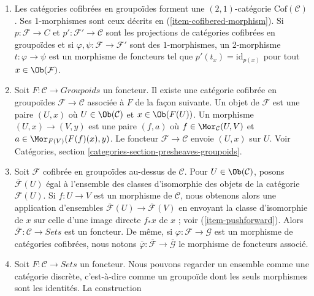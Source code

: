 \begin{remarks}
\begin{enumerate}
et $\mathcal{F}'$ sont des catégories cofibrées en groupoïdes au-dessus de
$\mathcal{C}$, nous notons les morphismes de $\mathcal{F}$ vers $\mathcal{F}'$
par $\Mor_\mathcal{C}(\mathcal{F}, \mathcal{F}')$.
\item
\label{item-definition-cofibered-groupoids-2-category}
Les catégories cofibrées en groupoïdes forment une $(2, 1)$-catégorie
$\text{Cof}(\mathcal{C})$. Ses 1-morphismes sont ceux décrits en
(\ref{item-cofibered-morphism}). Si $p : \mathcal{F} \to C$ et
$p': \mathcal{F}' \to \mathcal{C}$ sont les projections de catégories
cofibrées en groupoïdes et si $\varphi, \psi : \mathcal{F} \to \mathcal{F}'$
sont des $1$-morphismes, un 2-morphisme $t : \varphi \to \psi$ est un morphisme
de foncteurs tel que $p'(t_x) = \text{id}_{p(x)}$ pour tout $x \in \Ob(\mathcal{F})$.
\item
\label{item-construction-associated-cofibered-groupoid}
Soit $F : \mathcal{C} \to \textit{Groupoids}$ un foncteur. Il
existe une catégorie cofibrée en groupoïdes $\mathcal{F} \to \mathcal{C}$
associée à $F$ de la façon suivante. Un objet de $\mathcal{F}$ est une paire $(U, x)$
où $U \in \Ob(\mathcal{C})$ et $x \in \Ob(F(U))$. Un
morphisme $(U, x) \to (V, y)$ est une paire $(f, a)$ où
$f \in \Mor_\mathcal{C}(U, V)$ et
$a \in \Mor_{F(V)}(F(f)(x), y)$.
Le foncteur $\mathcal{F} \to \mathcal{C}$ envoie $(U, x)$ sur $U$. Voir
Catégories, section \ref{categories-section-presheaves-groupoids}.
\item
\label{item-associated-functor-isomorphism-classes}
Soit $\mathcal{F}$ cofibrée en groupoïdes au-dessus de $\mathcal{C}$.
Pour $U \in \Ob(\mathcal{C})$, posons $\overline{\mathcal{F}}(U)$ égal à
l'ensemble des classes d'isomorphie des objets de la catégorie $\mathcal{F}(U)$.
Si $f : U \to V$ est un morphisme de $\mathcal{C}$, nous obtenons alors une
application d'ensembles $\overline{\mathcal{F}}(U) \to \overline{\mathcal{F}}(V)$ en
envoyant la classe d'isomorphie de $x$ sur celle d'une image directe
$f_*x$ de $x$ ; voir (\ref{item-pushforward}). Alors
$\overline{\mathcal{F}} : \mathcal{C} \to \textit{Sets}$ est un
foncteur. De même, si $\varphi : \mathcal{F} \to \mathcal{G}$ est un
morphisme de catégories cofibrées, nous notons
$\overline{\varphi}: \overline{\mathcal{F}} \to  \overline{\mathcal{G}}$
le morphisme de foncteurs associé.
\item
\label{item-convention-cofibered-sets}
Soit $F: \mathcal{C} \to \textit{Sets}$ un foncteur. Nous pouvons regarder un
ensemble comme une catégorie discrète, c'est-à-dire comme un groupoïde dont les
seuls morphismes sont les identités. La construction

\end{enumerate}
\end{remarks}
